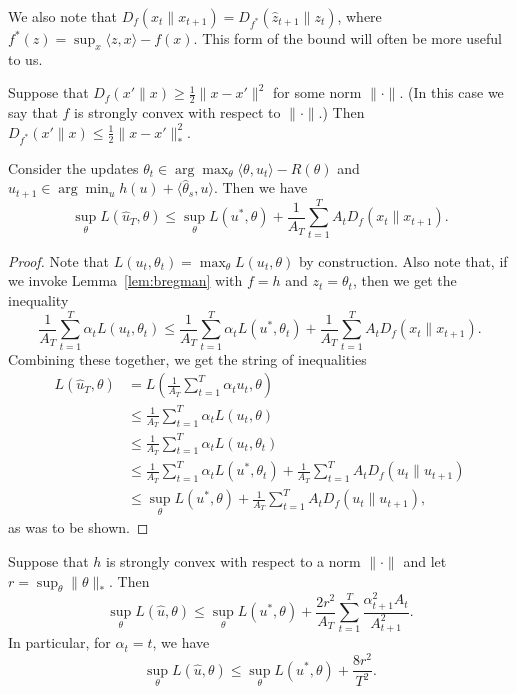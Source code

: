 \documentclass{article}
\begin{document}
We also note that $D_f(x_t \| x_{t+1}) = D_{f^*}(\hat{z}_{t+1} \| z_t)$, where $f^*(z) = \sup_x \langle z,x\rangle - f(x)$. 
This form of the bound will often be more useful to us.
\begin{lemma}
\label{lem:convexity}
Suppose that $D_f(x' \| x) \geq \frac{1}{2}\|x-x'\|^2$ for some 
norm $\|\cdot\|$. (In this case we say that $f$ is strongly 
convex with respect to $\|\cdot\|$.) 
Then $D_{f^*}(x' \| x) \leq \frac{1}{2}\|x-x'\|_{*}^2$.
\end{lemma}
\begin{proposition}
\label{prop:method-1}
Consider the updates $\theta_t \in \arg\max_{\theta} \langle \theta, u_t \rangle - R(\theta)$ 
and $u_{t+1} \in \arg\min_u h(u) + \langle \hat{\theta}_s, u \rangle$. 
Then we have
\begin{equation}
\sup_{\theta} L(\hat{u}_T, \theta) \leq \sup_{\theta} L(u^*, \theta) + \frac{1}{A_T} \sum_{t=1}^T A_tD_f(x_t \| x_{t+1}).
\end{equation}
\end{proposition}
\begin{proof}
Note that $L(u_t, \theta_t) = \max_{\theta} L(u_t, \theta)$ by construction. 
Also note that, if we invoke Lemma~\ref{lem:bregman} with $f = h$ and 
$z_t = \theta_t$, then we get the inequality
\begin{equation}
\frac{1}{A_T} \sum_{t=1}^T \alpha_t L(u_t, \theta_t) \leq \frac{1}{A_T} \sum_{t=1}^T \alpha_t L(u^*, \theta_t) + \frac{1}{A_T} \sum_{t=1}^T A_tD_f(x_t \| x_{t+1}).
\end{equation}
Combining these together, we get the string of inequalities
\begin{align*}
L(\hat{u}_T, \theta) &= L\left(\frac{1}{A_T} \sum_{t=1}^T \alpha_tu_t, \theta\right) \\
 &\leq \frac{1}{A_T} \sum_{t=1}^T \alpha_t L(u_t, \theta) \\
 &\leq \frac{1}{A_T} \sum_{t=1}^T \alpha_t L(u_t, \theta_t) \\
 &\leq \frac{1}{A_T} \sum_{t=1}^T \alpha_t L(u^*, \theta_t) + \frac{1}{A_T} \sum_{t=1}^T A_t D_f(u_t \| u_{t+1}) \\
 &\leq \sup_{\theta} L(u^*, \theta) + \frac{1}{A_T} \sum_{t=1}^T A_tD_f(u_t \| u_{t+1}),
\end{align*}
as was to be shown.
\end{proof}
\begin{corollary}
\label{cor:method-1}
Suppose that $h$ is strongly convex with respect to a norm $\|\cdot\|$ 
and let $r = \sup_{\theta} \|\theta\|_{*}$. Then 
\[ \sup_{\theta} L(\hat{u}, \theta) \leq \sup_{\theta} L(u^*, \theta) + \frac{2r^2}{A_T} \sum_{t=1}^T \frac{\alpha_{t+1}^2A_t}{A_{t+1}^2}. \]
In particular, for $\alpha_t = t$, we have
\[ \sup_{\theta} L(\hat{u}, \theta) \leq \sup_{\theta} L(u^*, \theta) + \frac{8r^2}{T^2}. \]
\end{corollary}
\end{document}
